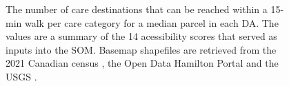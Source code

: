 \documentclass[
  authoryear,
  preprint,
  3p]{elsarticle}
\begin{document}
\begin{figure}


\caption{\label{fig-Fig4}The number of care destinations that can be
reached within a 15-min walk per care category for a median parcel in
each DA. The values are a summary of the 14 acessibility scores that
served as inputs into the SOM. Basemap shapefiles are retrieved from the
2021 Canadian census \citep{governmentofcanadaCensusPopulation2023}, the
Open Data Hamilton Portal \citep{opendatahamiltonCityBoundary2023} and
the USGS \citep{greatlakesUSGS2010}.}

\end{figure}%
\end{document}
